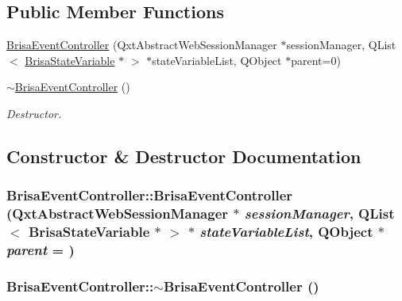 \subsection*{Public Member Functions}
\begin{DoxyCompactItemize}
\item 
\hyperlink{classBrisaUpnp_1_1BrisaEventController_aeddb0395178668408dcb4bb7a5b9b4fe}{BrisaEventController} (QxtAbstractWebSessionManager $\ast$sessionManager, QList$<$ \hyperlink{classBrisaUpnp_1_1BrisaStateVariable}{BrisaStateVariable} $\ast$ $>$ $\ast$stateVariableList, QObject $\ast$parent=0)
\item 
\hyperlink{classBrisaUpnp_1_1BrisaEventController_a4948b39364257de421eaff2a3d51b81b}{$\sim$BrisaEventController} ()
\begin{DoxyCompactList}\small\item\em Destructor. \item\end{DoxyCompactList}\end{DoxyCompactItemize}


\subsection{Constructor \& Destructor Documentation}
\hypertarget{classBrisaUpnp_1_1BrisaEventController_aeddb0395178668408dcb4bb7a5b9b4fe}{
\subsubsection[{BrisaEventController}]{\setlength{\rightskip}{0pt plus 5cm}BrisaEventController::BrisaEventController (QxtAbstractWebSessionManager $\ast$ {\em sessionManager}, \/  QList$<$ {\bf BrisaStateVariable} $\ast$ $>$ $\ast$ {\em stateVariableList}, \/  QObject $\ast$ {\em parent} = {})}}
\label{classBrisaUpnp_1_1BrisaEventController_aeddb0395178668408dcb4bb7a5b9b4fe}
\hypertarget{classBrisaUpnp_1_1BrisaEventController_a4948b39364257de421eaff2a3d51b81b}{
\subsubsection[{$\sim$BrisaEventController}]{\setlength{\rightskip}{0pt plus 5cm}BrisaEventController::$\sim$BrisaEventController ()}}
\label{classBrisaUpnp_1_1BrisaEventController_a4948b39364257de421eaff2a3d51b81b}



